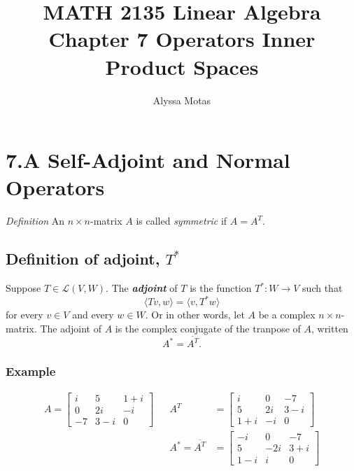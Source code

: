 \documentclass[11pt]{article}
\title{\textbf{MATH 2135 Linear Algebra} \\ Chapter 7 Operators Inner Product Spaces}
\author{Alyssa Motas}
\begin{document}
    \maketitle

    \pagebreak

    \tableofcontents

    \pagebreak

    \section{7.A Self-Adjoint and Normal Operators}

    \emph{Definition} An \(n \times n\)-matrix $A$ is called \emph{symmetric} if \(A = A^T\). 

    \subsection{Definition of adjoint, \(T^*\)}

    Suppose \(T \in \mathcal{L}(V,W)\). The \textbf{\emph{adjoint}} of $T$ is the function \(T^*: W \rightarrow V\) such that \[\langle Tv,w \rangle = \langle v, T^* w \rangle\] for every \(v \in V\) and every \(w \in W\). Or in other words, let $A$ be a complex \(n \times n\)-matrix. The adjoint of $A$ is the complex conjugate of the tranpose of $A$, written \[A^* = \overline{A^T}.\]

    \subsubsection{Example}

    \begin{align*}
        A = \begin{bmatrix}
            i & 5 & 1 + i \\
            0 & 2i & -i \\
            -7 & 3-i & 0
        \end{bmatrix} && A^T &= \begin{bmatrix}
            i & 0 & -7 \\
            5 & 2i & 3-i \\
            1+i & -i & 0
        \end{bmatrix} \\
        && A^* = \overline{A^T} &= \begin{bmatrix}
            -i & 0 & -7 \\
            5 & -2i & 3+i \\
            1 - i & i & 0
        \end{bmatrix}
    \end{align*}
\end{document}
